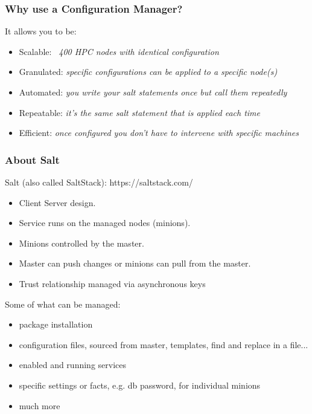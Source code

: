 \documentclass{beamer}
\begin{document}
\begin{frame}
\frametitle{Why use a Configuration Manager?}

It allows you to be:
\begin{itemize}
\item Scalable: \emph{~400 HPC nodes with identical configuration}
\item Granulated: \emph{specific configurations can be applied to a specific node(s)}
\item Automated: \emph{you write your salt statements once but call them repeatedly}
\item Repeatable: \emph{it's the same salt statement that is applied each time}
\item Efficient: \emph{once configured you don't have to intervene with specific machines}
\end{itemize}
\end{frame}

\begin{frame}
\frametitle{About Salt}
Salt (also called SaltStack): https://saltstack.com/\\
\begin{itemize}
\item Client Server design.\\
\item Service runs on the managed nodes (minions).\\
\item Minions controlled by the master.\\
\item Master can push changes or minions can pull from the master.\\
\item Trust relationship managed via asynchronous keys\\
\end{itemize}
Some of what can be managed:
\begin{itemize}
\item package installation
\item configuration files, sourced from master, templates, find and replace in a file...
\item enabled and running services
\item specific settings or facts, e.g. db password, for individual minions
\item much more
\end{itemize}
\end{frame}
\end{document}
